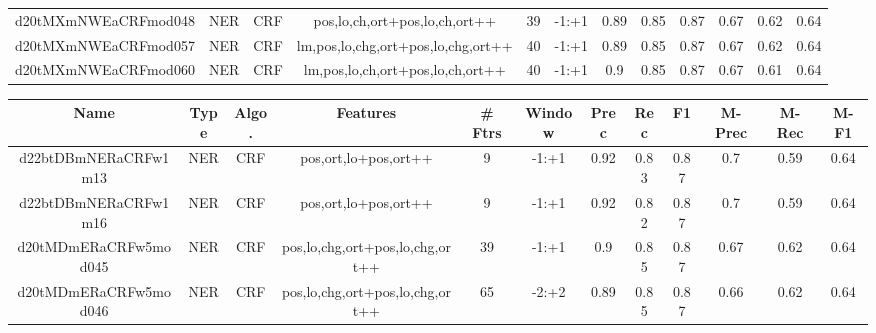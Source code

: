 \documentclass[a4paper]{article}
\begin{document}
\begin{landscape}
\begin{center}
\begin{tabular}{ |c|c|c|c|c|c|c|c|c|c|c|c|}
 
 	
 	\small{ d20tMXmNWEaCRFmod048 } & \small{ NER} & \small{  CRF }  & pos,lo,ch,ort+pos,lo,ch,ort++  &  39 &  \small{  -1:+1 }  &  0.89 & 0.85 & 0.87  &  0.67 & 0.62 & 0.64 \\
 	

 
 	
 	\small{ d20tMXmNWEaCRFmod057 } & \small{ NER} & \small{  CRF }  & lm,pos,lo,chg,ort+pos,lo,chg,ort++  &  40 &  \small{  -1:+1 }  &  0.89 & 0.85 & 0.87  &  0.67 & 0.62 & 0.64 \\
 	

 
 	
 	\small{ d20tMXmNWEaCRFmod060 } & \small{ NER} & \small{  CRF }  & lm,pos,lo,ch,ort+pos,lo,ch,ort++  &  40 &  \small{  -1:+1 }  &  0.9 & 0.85 & 0.87  &  0.67 & 0.61 & 0.64 \\
 	
 \hline
\end{tabular}
\end{center}




\begin{center}
\begin{tabular}{ |c|c|c|c|c|c|c|c|c|c|c|c|} 
 \hline
 	Name & Type & Algo. & Features & \# Ftrs & Window & Prec & Rec & F1 & M-Prec & M-Rec & M-F1\\
 \hline

 	

 
 	
 	\small{ d22btDBmNERaCRFw1m13 } & \small{ NER} & \small{  CRF }  & pos,ort,lo+pos,ort++  &  9 &  \small{  -1:+1 }  &  0.92 & 0.83 & 0.87  &  0.7 & 0.59 & 0.64 \\
 	

 
 	
 	\small{ d22btDBmNERaCRFw1m16 } & \small{ NER} & \small{  CRF }  & pos,ort,lo+pos,ort++  &  9 &  \small{  -1:+1 }  &  0.92 & 0.82 & 0.87  &  0.7 & 0.59 & 0.64 \\
 	

 
 	
 	\small{ d20tMDmERaCRFw5mod045 } & \small{ NER} & \small{  CRF }  & pos,lo,chg,ort+pos,lo,chg,ort++  &  39 &  \small{  -1:+1 }  &  0.9 & 0.85 & 0.87  &  0.67 & 0.62 & 0.64 \\
 	

 
 	
 	\small{ d20tMDmERaCRFw5mod046 } & \small{ NER} & \small{  CRF }  & pos,lo,chg,ort+pos,lo,chg,ort++  &  65 &  \small{  -2:+2 }  &  0.89 & 0.85 & 0.87  &  0.66 & 0.62 & 0.64 \\
 	


\end{tabular}
\end{center}
\end{landscape}
\end{document}
